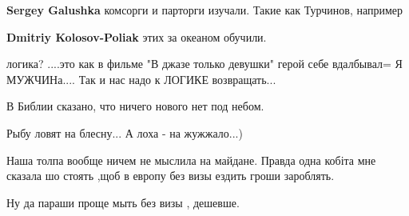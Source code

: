 \begin{itemize}
\begin{itemize}
\textbf{Sergey Galushka} комсорги и парторги изучали. Такие как Турчинов, например

 
\textbf{Dmitriy Kolosov-Poliak} этих за океаном обучили.
\end{itemize}

 
логика? ....это как в фильме "В джазе только девушки" герой себе вдалбывал= Я
МУЖЧИНа.... Так и нас надо к ЛОГИКЕ возвращать...

 
В Библии сказано, что ничего нового нет под небом.

 
Рыбу ловят на блесну... А лоха - на жужжало...)

 

Наша толпа вообще ничем не мыслила на майдане. Правда одна кобіта мне сказала
шо стоять ,щоб в европу без визы ездить гроши зароблять. 

Ну да параши проще мыть без визы , дешевше.

\begin{itemize}
 

\end{itemize}
\end{itemize}
